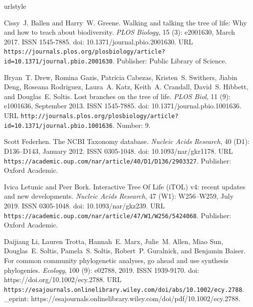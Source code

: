 \documentclass[oupdraft]{sysbio_sse}
\begin{document}

\begin{thebibliography}{18}
\providecommand{\natexlab}[1]{#1}
\providecommand{\url}[1]{\texttt{#1}}
\expandafter\ifx\csname urlstyle\endcsname\relax
  \providecommand{\doi}[1]{doi: #1}\else
  \providecommand{\doi}{doi: \begingroup \urlstyle{rm}\Url}\fi

Cissy~J. Ballen and Harry~W. Greene.
\newblock Walking and talking the tree of life: {Why} and how to teach about
  biodiversity.
\newblock \emph{PLOS Biology}, 15 (3): e2001630, March 2017.
\newblock ISSN 1545-7885.
\newblock \doi{10.1371/journal.pbio.2001630}.
\newblock URL
  \url{https://journals.plos.org/plosbiology/article?id=10.1371/journal.pbio.2001630}.
\newblock Publisher: Public Library of Science.

Bryan~T. Drew, Romina Gazis, Patricia Cabezas, Kristen~S. Swithers, Jiabin
  Deng, Roseana Rodriguez, Laura~A. Katz, Keith~A. Crandall, David~S. Hibbett,
  and Douglas~E. Soltis.
\newblock Lost branches on the tree of life.
\newblock \emph{PLOS Biol}, 11 (9): e1001636, September 2013.
\newblock ISSN 1545-7885.
\newblock \doi{10.1371/journal.pbio.1001636}.
\newblock URL
  \url{http://journals.plos.org/plosbiology/article?id=10.1371/journal.pbio.1001636}.
\newblock Number: 9.

Scott Federhen.
\newblock The {NCBI} {Taxonomy} database.
\newblock \emph{Nucleic Acids Research}, 40 (D1): D136--D143,
  January 2012.
\newblock ISSN 0305-1048.
\newblock \doi{10.1093/nar/gkr1178}.
\newblock URL \url{https://academic.oup.com/nar/article/40/D1/D136/2903327}.
\newblock Publisher: Oxford Academic.

Ivica Letunic and Peer Bork.
\newblock Interactive {Tree} {Of} {Life} ({iTOL}) v4: recent updates and new
  developments.
\newblock \emph{Nucleic Acids Research}, 47 (W1): W256--W259,
  July 2019.
\newblock ISSN 0305-1048.
\newblock \doi{10.1093/nar/gkz239}.
\newblock URL \url{https://academic.oup.com/nar/article/47/W1/W256/5424068}.
\newblock Publisher: Oxford Academic.

Daijiang Li, Lauren Trotta, Hannah~E. Marx, Julie~M. Allen, Miao Sun,
  Douglas~E. Soltis, Pamela~S. Soltis, Robert~P. Guralnick, and Benjamin
  Baiser.
\newblock For common community phylogenetic analyses, go ahead and use
  synthesis phylogenies.
\newblock \emph{Ecology}, 100 (9): e02788, 2019.
\newblock ISSN 1939-9170.
\newblock \doi{https://doi.org/10.1002/ecy.2788}.
\newblock URL
  \url{https://esajournals.onlinelibrary.wiley.com/doi/abs/10.1002/ecy.2788}.
\newblock \_eprint:
  https://esajournals.onlinelibrary.wiley.com/doi/pdf/10.1002/ecy.2788.


\end{thebibliography}
\end{document}
